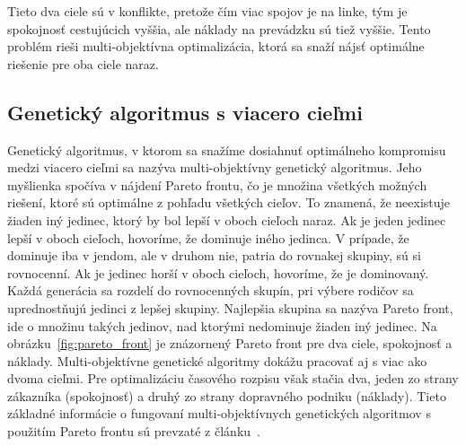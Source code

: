 Tieto dva ciele sú v konflikte, pretože čím viac spojov je na linke, tým je spokojnosť cestujúcich vyššia, ale náklady na prevádzku sú tiež vyššie.
Tento problém rieši multi-objektívna optimalizácia, ktorá sa snaží nájsť optimálne riešenie pre oba ciele naraz.

\subsection*{Genetický algoritmus s viacero cieľmi}
Genetický algoritmus, v ktorom sa snažíme dosiahnuť optimálneho kompromisu medzi viacero cieľmi sa nazýva multi-objektívny genetický algoritmus.
Jeho myšlienka spočíva v nájdení Pareto frontu, čo je množina všetkých možných riešení, ktoré sú optimálne z pohľadu všetkých cieľov.
To znamená, že neexistuje žiaden iný jedinec, ktorý by bol lepší v oboch cieľoch naraz.
Ak je jeden jedinec lepší v oboch cieľoch, hovoríme, že dominuje iného jedinca.
V prípade, že dominuje iba v jendom, ale v druhom nie, patria do rovnakej skupiny, sú si rovnocenní.
Ak je jedinec horší v oboch cieľoch, hovoríme, že je dominovaný.
Každá generácia sa rozdelí do rovnocenných skupín, pri výbere rodičov sa uprednostňujú jedinci z lepšej skupiny.
Najlepšia skupina sa nazýva Pareto front, ide o množinu takých jedinov, nad ktorými nedominuje žiaden iný jedinec.
Na obrázku~\ref{fig:pareto_front} je znázornený Pareto front pre dva ciele, spokojnosť a náklady.
Multi-objektívne genetické algoritmy dokážu pracovať aj s viac ako dvoma cieľmi.
Pre optimalizáciu časového rozpisu však stačia dva, jeden zo strany zákazníka (spokojnosť) a druhý zo strany dopravného podniku (náklady).
Tieto základné informácie o fungovaní multi-objektívnych genetických algoritmov s použitím Pareto frontu sú prevzaté z článku~\cite{ngatchou2005pareto}.


